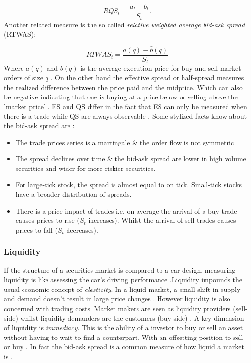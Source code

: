 \documentclass{kththesis}
\theoremstyle{definition}
\begin{document}
\begin{equation*}
    RQS_t = \frac{a_t - b_t}{S_t}.
\end{equation*}
Another related measure is the so called \textit{relative weighted average bid-ask spread} (RTWAS):

\begin{equation}
\label{eq:4}
    RTWAS_{t} = \frac{\bar{a}(q) - \bar{b}(q)}{S_t}
\end{equation}
Where $\bar{a}(q)$ and $\bar{b}(q)$ is the average execution price for buy and sell market orders of size $q$ \parencite{foucault2013market}. On the other hand the effective spread or half-spread measures the realized difference between the price paid and the midprice. Which can also be negative indicating that one is buying at a price below or selling above the 'market price' \parencite{cartea2015algorithmic}. ES and QS differ in the fact that ES can only be measured when there is a trade while QS are always observable \parencite{cartea2015algorithmic}. Some stylized facts know about the bid-ask spread are \parencite{hasbrouck2007empirical, madhavan2002market, bouchaud2018trades}:
\begin{itemize}
    \item The trade prices series is a martingale \& the order flow is not symmetric
    \item The spread declines over time \& the bid-ask spread are lower in high volume securities and wider for more riskier securities.
    \item For large-tick stock, the spread is almost equal to on tick. Small-tick stocks have a broader distribution of spreads.
    \item There is a price impact of trades i.e. on average the arrival of a buy trade causes prices to rise ($S_t$ increases). Whilst the arrival of sell trades causes prices to fall ($S_t$ decreases).
\end{itemize}

\subsubsection*{Liquidity}
If the structure of a securities market is compared to a car design, measuring liquidity is like assessing the car's driving performance \parencite{foucault2013market}.Liquidity impounds the usual economic concept of \textit{elasticity}. In a liquid market, a small shift in supply and demand doesn't result in large price changes \parencite{hasbrouck2007empirical}. However liquidity is also concerned with trading costs. Market makers are seen as liquidity providers (sell-side) whilst liquidity demanders are the customers (buy-side) \parencite{hasbrouck2007empirical}. A key dimension of liquidity is \textit{immediacy}. This is the ability of a investor to buy or sell an asset without having to wait to find a counterpart. With an offsetting position to sell or buy \parencite{cartea2015algorithmic}. In fact the bid-ask spread is a common measure of how liquid a market is \parencite{foucault2013market}.
\end{document}
